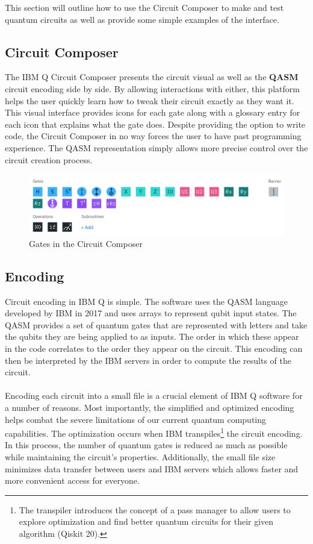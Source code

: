 \documentclass[12pt]{article}
\begin{document}
    This section will outline how to use the Circuit Composer to make and test quantum circuits as well as provide some simple examples of the interface.
    
    \subsection{Circuit Composer}
        The IBM Q Circuit Composer presents the circuit visual as well as the \textbf{QASM} circuit encoding side by side. By allowing interactions with either, this platform helps the user quickly learn how to tweak their circuit exactly as they want it. This visual interface provides icons for each gate along with a glossary entry for each icon that explains what the gate does. Despite providing the option to write code, the Circuit Composer in no way forces the user to have past programming experience. The QASM representation simply allows more precise control over the circuit creation process.
        
        \begin{figure}[ht]
            \centering
            \includegraphics[width=\linewidth]{Circuits/gates.png}
            \caption{Gates in the Circuit Composer}
        \end{figure}
        
    \subsection{Encoding}
        Circuit encoding in IBM Q is simple. The software uses the QASM language developed by IBM in 2017 and uses arrays to represent qubit input states. The QASM provides a set of quantum gates that are represented with letters and take the qubits they are being applied to as inputs. The order in which these appear in the code correlates to the order they appear on the circuit. This encoding can then be interpreted by the IBM servers in order to compute the results of the circuit.
        \\
         \smallskip
        \\
        Encoding each circuit into a small file is a crucial element of IBM Q software for a number of reasons. Most importantly, the simplified and optimized encoding helps combat the severe limitations of our current quantum computing capabilities. The optimization occurs when IBM transpiles\footnote{The transpiler introduces the concept of a pass manager to allow users to explore optimization and find better quantum circuits for their given algorithm (Qiskit 20).} the circuit encoding. In this process, the number of quantum gates is reduced as much as possible while maintaining the circuit's properties. Additionally, the small file size minimizes data transfer between users and IBM servers which allows faster and more convenient access for everyone.
\end{document}
